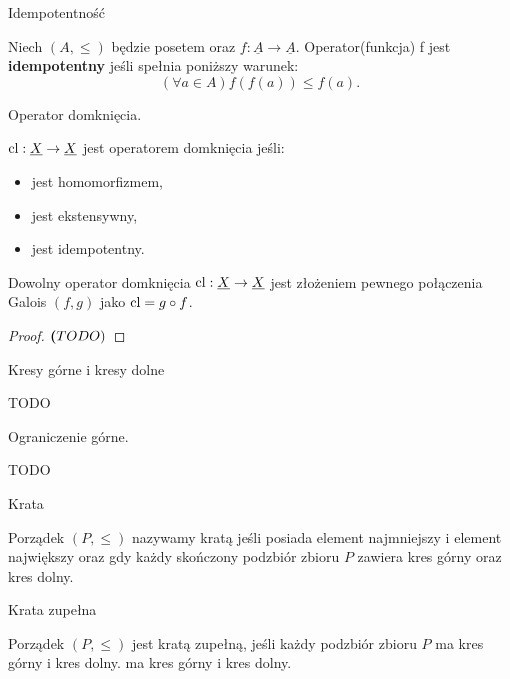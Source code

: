 \begin{definition}{Idempotentność}
	
	Niech $(A, \le)$ będzie posetem oraz $f: \underline{A} \rightarrow \underline{A}$.
Operator(funkcja) f jest \textbf{idempotentny} jeśli spełnia poniższy warunek:
	\[
	\left( \forall a \in A \right)f(f(a)) \le  f(a) 	
	.\] 
\end{definition}

\begin{definition}{Operator domknięcia.}

	$\operatorname{cl}:\underline{X} \rightarrow \underline{X} $ jest operatorem domknięcia jeśli:
	\begin{itemize}
		\item jest homomorfizmem,
		\item jest ekstensywny,
		\item jest idempotentny.
	\end{itemize}
\end{definition}

\begin{theorem}
	
	Dowolny operator domknięcia $\operatorname{cl}:\underline{X} \rightarrow\underline{X} $ jest złożeniem pewnego połączenia Galois $(f,g)$ jako $\operatorname{cl}=g\circ f$.
\end{theorem}
\begin{proof}
	$\textbf(TODO)$
\end{proof}

\begin{definition}{Kresy górne i kresy dolne}

	TODO
\end{definition}

\begin{definition}{Ograniczenie górne.}
	
	TODO	
\end{definition}

\begin{definition}{Krata}
	
	Porządek $(P, \le )$ nazywamy kratą jeśli posiada element najmniejszy i element największy oraz gdy każdy skończony podzbiór zbioru $P$ zawiera kres górny oraz kres dolny.
\end{definition}

\begin{definition}{Krata zupełna}
	
	Porządek $\left( P, \le  \right) $ jest kratą zupełną, jeśli każdy podzbiór zbioru $P$ ma kres górny i kres dolny. ma kres górny i kres dolny.
\end{definition}
